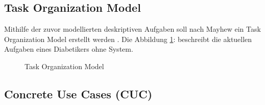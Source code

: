  \subsection{Task Organization Model}
 Mithilfe der zuvor modellierten deskriptiven Aufgaben soll nach Mayhew ein Task Organization Model erstellt werden \cite{MD}. Die Abbildung \ref{img:taskorganizationmodel}: \glqq {}\grqq{} beschreibt die aktuellen Aufgaben eines Diabetikers ohne System.
 \begin{figure}[H]
 	\centering
 	\setlength{\fboxsep}{1pt}
 	\setlength{\fboxrule}{1pt}
 	\captionsetup{justification=centering}
 	\caption{Task Organization Model}
 	\label{img:taskorganizationmodel}
 \end{figure}
 \subsection{Concrete Use Cases (CUC)}
